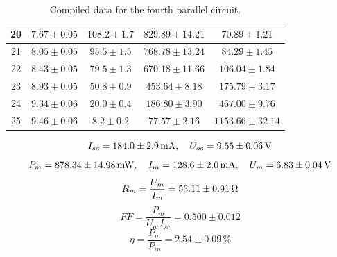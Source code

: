 \begin{table}[!h]
\begin{center}
\begin{tabular}{|c|c|c|c|c|}
\hline
20	&	$7.67 \pm 0.05$	&	$108.2 \pm 1.7$	&	$829.89 \pm 14.21$	&	$70.89 \pm 1.21$	\\
\hline
21	&	$8.05 \pm 0.05$	&	$95.5 \pm 1.5$	&	$768.78 \pm 13.24$	&	$84.29 \pm 1.45$	\\
\hline
22	&	$8.43 \pm 0.05$	&	$79.5 \pm 1.3$	&	$670.18 \pm 11.66$	&	$106.04 \pm 1.84$	\\
\hline
23	&	$8.93 \pm 0.05$	&	$50.8 \pm 0.9$	&	$453.64 \pm 8.18$	&	$175.79 \pm 3.17$	\\
\hline
24	&	$9.34 \pm 0.06$	&	$20.0 \pm 0.4$	&	$186.80 \pm 3.90$	&	$467.00 \pm 9.76$	\\
\hline
25	&	$9.46 \pm 0.06$	&	$8.2 \pm 0.2$	&	$77.57 \pm 2.16$	&	$1153.66 \pm 32.14$	\\
\hline
\end{tabular}
\caption{Compiled data for the fourth parallel circuit.}
\label{tab-com-4}
\end{center}
\end{table}

$$I_{sc}=184.0\pm2.9\,{\rm mA},\quad U_{oc}=9.55\pm0.06\,{\rm V}$$
$$P_m=878.34\pm14.98\,{\rm mW},\quad I_m=128.6\pm2.0\,{\rm mA},\quad U_m=6.83\pm0.04\,{\rm V}$$
$$R_m=\frac{U_m}{I_m}=53.11\pm0.91\,{\rm \Omega}$$
$$FF=\frac{P_m}{U_{oc}I_{sc}}=0.500\pm0.012$$
$$\eta=\frac{P_m}{P_{in}}=2.54\pm0.09\,\%$$
$$$$

